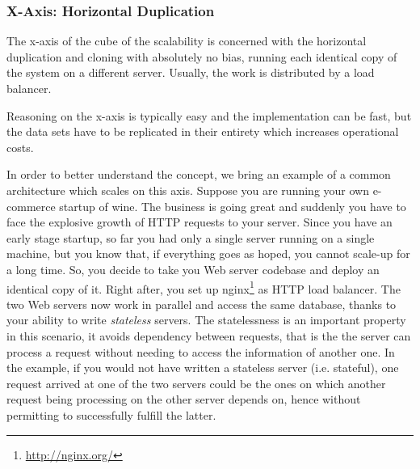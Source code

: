\subsubsection{X-Axis: Horizontal Duplication}

The x-axis of the cube of the scalability is concerned with the horizontal
duplication and cloning with absolutely no bias, running each identical copy of
the system on a different server. Usually, the work is distributed by a load
balancer.

Reasoning on the x-axis is typically easy and the implementation can be fast,
but the data sets have to be replicated in their entirety which increases
operational costs.

In order to better understand the concept, we bring an example of a common
architecture which scales on this axis. Suppose you are running your own
e-commerce startup of wine. The business is going great and suddenly you have to
face the explosive growth of HTTP requests to your server. Since you have an
early stage startup, so far you had only a single server running on a single
machine, but you know that, if everything goes as hoped, you cannot scale-up for
a long time. So, you decide to take you Web server codebase and deploy an
identical copy of it. Right after, you set up
nginx\footnote{\url{http://nginx.org/}} as HTTP load balancer. The two Web
servers now work in parallel and access the same database, thanks to your
ability to write \emph{stateless} servers. The statelessness is an important
property in this scenario, it avoids dependency between requests, that is the
the server can process a request without needing to access the information of
another one. In the example, if you would not have written a stateless server
(i.e. stateful), one request arrived at one of the two servers could be the ones
on which another request being processing on the other server depends on, hence
without permitting to successfully fulfill the latter.



